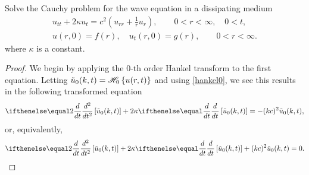 \begin{problem}{7.12}
  Solve the Cauchy problem for the wave equation in a dissipating medium
  \begin{align*}
    u_{tt} + 2 \kappa u_t = c^2 \left(u_{rr} + \frac{1}{r}u_r\right),\qquad 0 < r < \infty, \quad 0 < t, \\
    u(r, 0) = f(r), \quad u_t(r, 0) = g(r), \qquad 0 < r < \infty.
  \end{align*}
  where $\kappa$ is a constant.
\end{problem}

\begin{proof}
  We begin by applying the 0-th order Hankel transform to the first equation. Letting
  $\tilde{u}_0(k, t) = \mathscr{H}_{ {0} }\left\{ {u(r, t)} \right\}$ and using \eqref{hankel0},
  we see this results in the following transformed equation
  \begin{align*}
    \der{t}{2}\left[\tilde{u}_0(k, t)\right] + 2\kappa \der{t}{}\left[\tilde{u}_0(k, t)\right] = -(kc)^2 \tilde{u}_0(k, t),
  \end{align*}
  or, equivalently,
  \begin{align*}
    \der{t}{2}\left[\tilde{u}_0(k, t)\right] + 2\kappa \der{t}{}\left[\tilde{u}_0(k, t)\right] + (kc)^2 \tilde{u}_0(k, t) = 0.
  \end{align*}


\end{proof}
